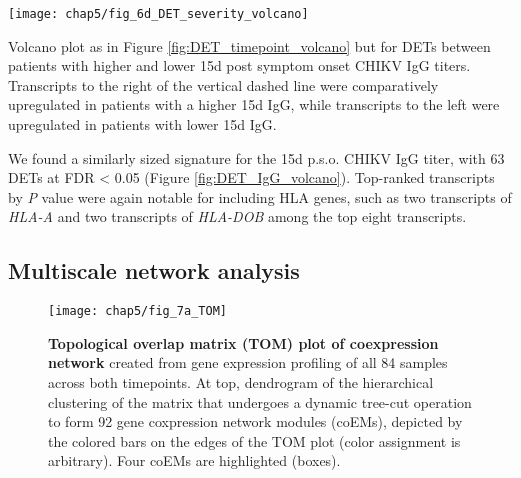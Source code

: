 \begin{marginfigure}[-2cm]
  \centering
  \texttt{[image: chap5/fig\_6d\_DET\_severity\_volcano]}
  \caption[Volcano plot of differentially expressed host transcripts for symptom severity]{
  Volcano plot as in Figure \ref{fig:DET_timepoint_volcano} but for DETs between patients with higher and lower 15d post symptom onset CHIKV IgG titers. Transcripts to the right of the vertical dashed line were comparatively upregulated in patients with a higher 15d IgG, while transcripts to the left were upregulated in patients with lower 15d IgG.
  }
  \label{fig:DET_IgG_volcano}
\end{marginfigure}

We found a similarly sized signature for the 15d p.s.o. CHIKV IgG titer, with 63 DETs at FDR < 0.05 (Figure \ref{fig:DET_IgG_volcano}). Top-ranked transcripts by \emph{P} value were again notable for including HLA genes, such as two transcripts of \emph{HLA-A} and two transcripts of \emph{HLA-DOB} among the top eight transcripts.

\subsection{Multiscale network analysis}

\begin{figure}[htb]
  \centering
  \texttt{[image: chap5/fig\_7a\_TOM]}
  \caption[Topological overlap matrix (TOM) plot of coexpression network]{
  \textbf{Topological overlap matrix (TOM) plot of coexpression network} created from gene expression profiling of all 84 samples across both timepoints. At top, dendrogram of the hierarchical clustering of the matrix that undergoes a dynamic tree-cut operation to form 92 gene coxpression network modules (coEMs), depicted by the colored bars on the edges of the TOM plot (color assignment is arbitrary). Four coEMs are highlighted (boxes).
  }
  \label{fig:chik_TOM}
\end{figure}

